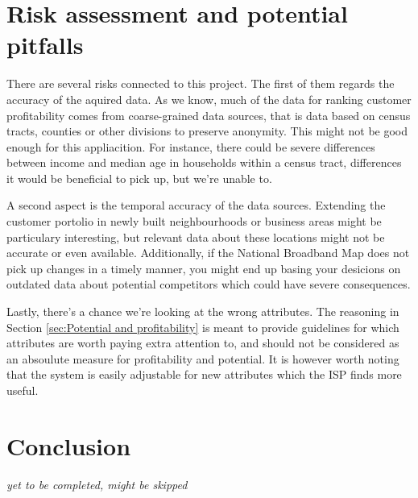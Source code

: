 \documentclass[twocolumn]{article}
\begin{document}
\section{Risk assessment and potential pitfalls}
\label{sec:Risk assesment and potential pitfalls}
There are several risks connected to this project. The first of them regards the accuracy of the aquired data. As we know, much of the data for ranking customer profitability comes from coarse-grained data sources, that is data based on census tracts, counties or other divisions to preserve anonymity. This might not be good enough for this appliacition. For instance, there could be severe differences between income and median age in households within a census tract, differences it would be beneficial to pick up, but we're unable to.

A second aspect is the temporal accuracy of the data sources. Extending the customer portolio in newly built neighbourhoods or business areas might be particulary interesting, but relevant data about these locations might not be accurate or even available. Additionally, if the National Broadband Map does not pick up changes in a timely manner, you might end up basing your desicions on outdated data about potential competitors which could have severe consequences.

Lastly, there's a chance we're looking at the wrong attributes. The reasoning in Section \ref{sec:Potential and profitability} is meant to provide guidelines for which attributes are worth paying extra attention to, and should not be considered as an absoulute measure for profitability and potential. It is however worth noting that the system is easily adjustable for new attributes which the ISP finds more useful.

\section{Conclusion}
\label{sec:Conclusion}
\textit{yet to be completed, might be skipped}

\printbibliography
\end{document}
